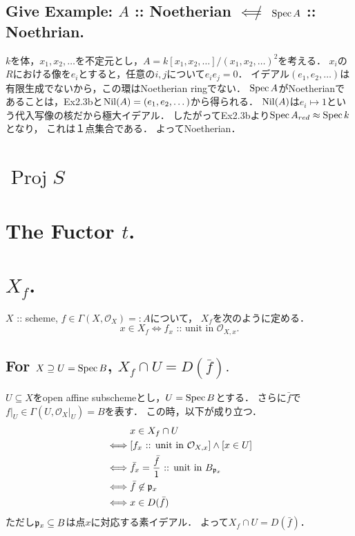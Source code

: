 \documentclass[a4paper]{jsarticle}
\newcommand{\shO}{\mathcal{O}}
\newcommand{\Proj}{\operatorname{Proj}}
\begin{document}
    \subsection{Give Example: $A$ :: Noetherian $\not \impliedby$ $\operatorname{Spec} A$ :: Noethrian.}
    $k$を体，$x_1,x_2,\dots$を不定元とし，$A=k[x_1,x_2,\dots]/(x_1,x_2,\dots)^2$を考える．
    $x_i$の$R$における像を$e_i$とすると，任意の$i,j$について$e_i e_j=0$．
    イデアル$(e_1,e_2,\dots)$は有限生成でないから，この環はNoetherian ringでない．
    $\operatorname{Spec} A$がNoetherianであることは，Ex2.3bと$\operatorname{Nil}(A)=(e_1,e_2,\dots)$から得られる．
    $\operatorname{Nil}(A)$は$e_i \mapsto 1$という代入写像の核だから極大イデアル．
    したがってEx2.3bより$\operatorname{Spec} A_{red} \approx \operatorname{Spec} k$となり，
    これは１点集合である．
    よってNoetherian．

\section{$\Proj S$} %

\section{The Fuctor $t$.} %

\section{$X_f$.} %
    $X$ :: scheme, $f \in \Gamma(X, \shO_X)=:A$について，
    $X_f$を次のように定める．
    \[ x \in X_f \iff f_x \text{ :: unit in }\shO_{X,x}. \]

    \subsection{For $X \supseteq U=\operatorname{Spec} B$, $X_f \cap U=D(\bar{f}).$}
    $U \subseteq X$をopen affine subschemeとし，$U=\operatorname{Spec} B$とする．
    さらに$\bar{f}$で$f|_{U} \in \Gamma(U,\shO_X|_U)=B$を表す．
    この時，以下が成り立つ．
    \begin{align*}
        {}&     x \in X_f \cap U \\
        \iff&   [ f_x \text{ :: unit in }\shO_{X,x}] \land [x \in U] \\
        \iff&   \bar{f}_x=\frac{\bar{f}}{1} \text{ :: unit in }B_{\I{p}_x} \\
        \iff&   \bar{f} \not\in \I{p}_x \\
        \iff&   x \in D(\bar{f})
    \end{align*}
    ただし$\mathfrak{p}_x \subseteq B$は点$x$に対応する素イデアル．
    よって$X_f \cap U=D(\bar{f})$．
\end{document}

